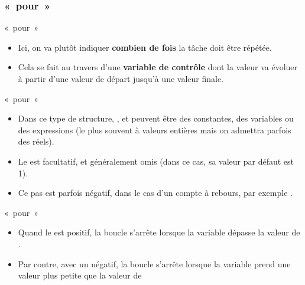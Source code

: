 \subsubsection{«~pour~»}

\begin{frame}{«~pour~»}
	\begin{itemize}
		\item
		Ici, on va plutôt indiquer \textbf{combien de fois} la tâche doit être
		répétée. 
		\item
		Cela se fait au travers d'une
		\textbf{variable de contrôle} dont la valeur va évoluer à partir
		d'une valeur de départ jusqu'à une
		valeur finale.
	\end{itemize}
\end{frame}

\begin{frame}{«~pour~»}

	\begin{itemize}
		\item
		Dans ce type de structure, ,  et 
		peuvent être des constantes, des variables ou des expressions (le plus
		souvent à valeurs entières mais on admettra parfois des réels). 
		\item
		Le  est facultatif, et généralement omis (dans ce cas, sa valeur 
		par défaut est 1). 
		\item
		Ce pas est parfois négatif, dans le cas
		d'un compte à rebours, par exemple
		.
	\end{itemize}
\end{frame}

\begin{frame}{«~pour~»}
	\begin{itemize}
		\item
		Quand le  est positif, la boucle s'arrête
		lorsque la variable dépasse la valeur de .
		\item
		Par contre, avec
		un  négatif, la boucle s'arrête lorsque la
		variable prend une valeur plus petite que la valeur de 
	\end{itemize}
\end{frame}


